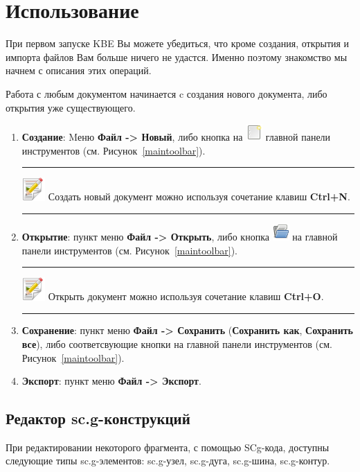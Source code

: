 \section{Использование}
\label{usage}

При первом запуске KBE Вы можете убедиться, что кроме создания, открытия и импорта файлов Вам больше ничего не удастся. Именно поэтому знакомство мы начнем с описания этих операций.

Работа с любым документом начинается c создания нового документа, либо открытия уже существующего.
\begin{enumerate}
	\item \textbf{Создание}: Mеню \textbf{Файл -> Новый}, либо кнопка на \includegraphics{../images/document-new.png} главной панели инструментов (см. Рисунок~\ref{maintoolbar}).
	\hrule
	\smallskip
	\noindent\includegraphics[width=25pt, height=25pt]{../images/note.png} \textcolor[rgb]{.67,.05,.05}{Создать новый документ можно используя сочетание клавиш \textbf{Ctrl+N}.}
	\smallskip
	\hrule

	\item \textbf{Открытие}: пункт меню \textbf{Файл -> Открыть}, либо кнопка \includegraphics{../images/document-open.png} на главной панели инструментов (см. Рисунок~\ref{maintoolbar}).
	\hrule
	\smallskip
	\noindent\includegraphics[width=25pt, height=25pt]{../images/note.png} \textcolor[rgb]{.67,.05,.05}{Открыть документ можно используя сочетание клавиш \textbf{Ctrl+O}.}
	\smallskip
	\hrule

	\item \textbf{Сохранение}: пункт меню \textbf{Файл -> Сохранить} (\textbf{Сохранить как}, \textbf{Сохранить все}), либо соответсвующие кнопки на главной панели инструментов (см. Рисунок~\ref{maintoolbar}).

	\item \textbf{Экспорт}: пункт меню \textbf{Файл -> Экспорт}.
\end{enumerate}
\subsection{Редактор sc.g-конструкций}
При редактировании некоторого фрагмента, с помощью SCg-кода, доступны следующие типы sc.g-элементов: {\sf sc.g-узел}, {\sf sc.g-дуга}, {\sf sc.g-шина}, {\sf sc.g-контур}.
 

